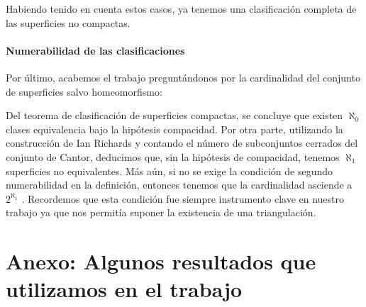 \documentclass[a4paper,11pt,spanish, twoside, leqno]{tfg-uam}
\theoremstyle{definition}
\begin{document}
Habiendo tenido en cuenta estos casos, ya tenemos una clasificación completa de las superficies no compactas.

\subsubsection*{Numerabilidad de las clasificaciones}
Por último, acabemos el trabajo preguntándonos por la  cardinalidad del conjunto de superficies salvo homeomorfismo:

 Del teorema de clasificación de superficies compactas, se concluye que existen $\aleph_0$  clases equivalencia bajo la hipótesis compacidad. Por otra parte, utilizando la construcción de Ian Richards y contando el número de subconjuntos cerrados del conjunto de Cantor, deducimos que, sin la hipótesis de compacidad, tenemos $\aleph_1$ superficies no equivalentes. Más aún, si no se exige la condición de segundo numerabilidad en la definición, entonces tenemos que la cardinalidad asciende a $2^{\aleph_1}$ \cite{nosegundonomuerable}. Recordemos que esta condición fue siempre instrumento clave en nuestro trabajo ya que nos permitía suponer la existencia de una triangulación.





\chapter{Anexo: Algunos resultados que utilizamos en el trabajo}
\end{document}
